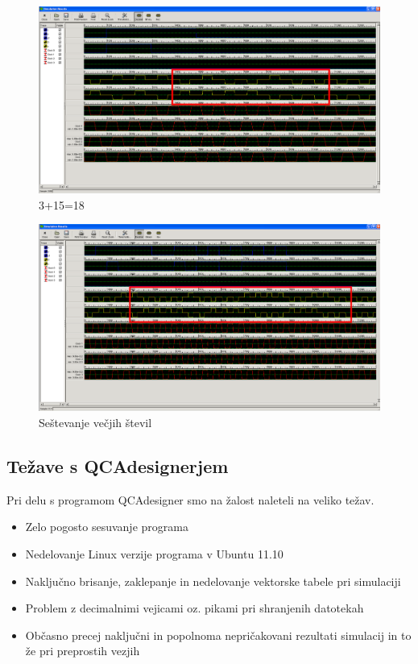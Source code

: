 \documentclass[seminar, slovene]{FRIreport}
\begin{document}
\begin{minipage}[H]{16cm}
\begin{figure}[H]
\includegraphics[width=14cm]{simulacije/3+15}
\caption{3+15=18}
\label{3+15}
\end{figure}
\begin{figure}[H]
\includegraphics[width=14cm]{simulacije/long}
\caption{Seštevanje večjih števil}
\label{sestevalnik}
\end{figure}
\end{minipage}

\pagebreak
\subsection{Težave s QCAdesignerjem}
Pri delu s programom QCAdesigner smo na žalost naleteli na veliko težav.
\begin{itemize}
\item Zelo pogosto sesuvanje programa
\item Nedelovanje Linux verzije programa v Ubuntu 11.10
\item Naključno brisanje, zaklepanje in nedelovanje vektorske tabele pri simulaciji
\item Problem z decimalnimi vejicami oz. pikami pri shranjenih datotekah
\item Občasno precej naključni in popolnoma nepričakovani rezultati simulacij in to že pri preprostih vezjih
\end{itemize}
\end{document}
